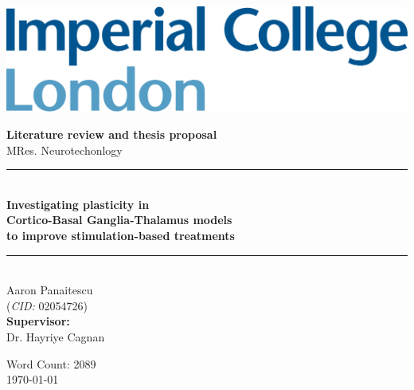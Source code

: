 \begin{titlepage}
	\newcommand{\HRule}{\rule{\linewidth}{0.5mm}}
	\setlength{\topmargin}{0in}
	\center

	\begin{flushleft} \large
		\begin{minipage}{0.4\textwidth}
			\includegraphics[scale=0.14]{imperial.png}
		\end{minipage}
	\end{flushleft}
	\vspace{4cm}

	\textbf{\large Literature review and thesis proposal}\\[0.1cm]
	{\large MRes. Neurotechonlogy}\\[0.5cm]

	\HRule \\[0.4cm]
	{\Large \bfseries Investigating plasticity in \\ Cortico-Basal Ganglia-Thalamus models \\ to improve stimulation-based treatments }
	\HRule \\[1cm]


	{\large Aaron Panaitescu \\
	(\textit{CID:} 02054726) \\[0.4cm]
	\textbf{Supervisor:} \\
	Dr. Hayriye Cagnan}


	\vfill
	{Word Count: 2089}\\[0.4cm]
	{\large \today}\\[0.8cm]
\end{titlepage}
\tableofcontents
\vfill
\printacronymsinline

